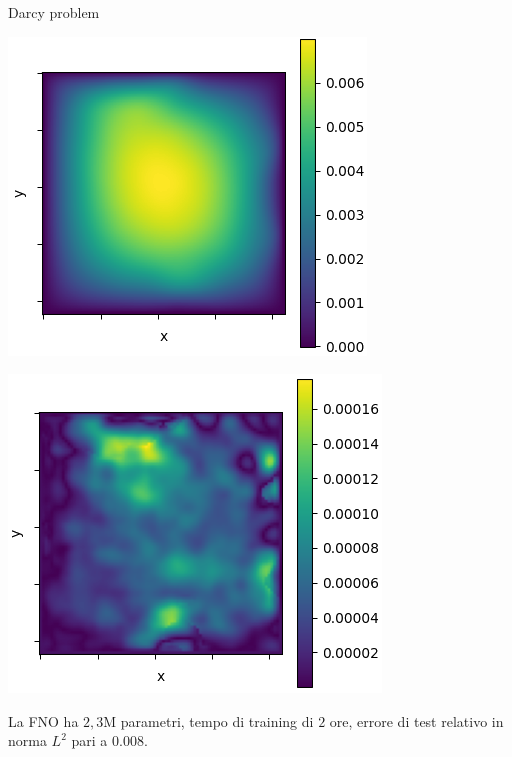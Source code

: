 \documentclass[aspectratio=169]{beamer}
\begin{document}
\begin{frame}[t]{Darcy problem}
\begin{center}
\begin{minipage}{0.24\textwidth}
        \end{minipage}
        \hfill
        \begin{minipage}{0.24\textwidth}
            \includegraphics[width=\textwidth]{operators/darcy/FNOappro.png}
        \end{minipage}
        \hfill
        \begin{minipage}{0.24\textwidth}
            \includegraphics[width=\textwidth]{operators/darcy/error.png}
        \end{minipage}
    \end{center}
    La FNO ha $2,3$M parametri, tempo di training di $2$ ore, errore di test relativo in norma $L^{2}$ pari a $0.008$.
\end{frame}
\end{document}
